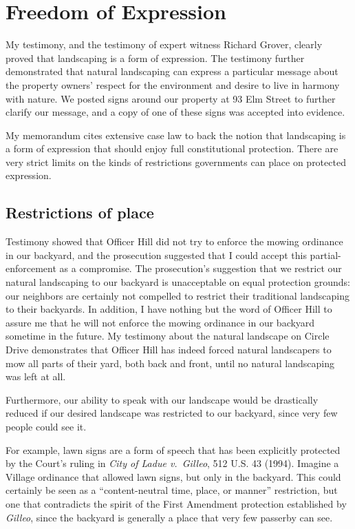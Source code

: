 \documentclass[12pt]{article}
\begin{document}
\tableofcontents

\newpage

\section{Freedom of Expression}

My testimony, and the testimony of expert witness Richard Grover, clearly proved that landscaping is a form of expression.
The testimony further demonstrated that natural landscaping can express a particular message about the property owners' respect for the environment and desire to live in harmony with nature.
We posted signs around our property at 93 Elm Street to further clarify our message, and a copy of one of these signs was accepted into evidence.

My memorandum cites extensive case law to back the notion that landscaping is a form of expression that should enjoy full constitutional protection.
There are very strict limits on the kinds of restrictions governments can place on protected expression.

\subsection{Restrictions of place}
Testimony showed that Officer Hill did not try to enforce the mowing ordinance in our backyard, and the prosecution suggested that I could accept this partial-enforcement as a compromise. 
The prosecution's suggestion that we restrict our natural landscaping to our backyard is unacceptable on equal protection grounds:  our neighbors are certainly not compelled to restrict their traditional landscaping to their backyards.
In addition, I have nothing but the word of Officer Hill to assure me that he will not enforce the mowing ordinance in our backyard sometime in the future.
My testimony about the natural landscape on Circle Drive demonstrates that Officer Hill has indeed forced natural landscapers to mow all parts of their yard, both back and front, until no natural landscaping was left at all.

Furthermore, our ability to speak with our landscape would be drastically reduced if our desired landscape was restricted to our backyard, since very few people could see it.

For example, lawn signs are a form of speech that has been explicitly protected by the Court's ruling in {\em City of Ladue v.\ Gilleo}, 512 U.S. 43 (1994).
Imagine a Village ordinance that allowed lawn signs, but only in the backyard.
This could certainly be seen as a ``content-neutral time, place, or manner'' restriction, but one that contradicts the spirit of the First Amendment protection established by {\it Gilleo}, since the backyard is generally a place that very few passerby can see.
\end{document}
